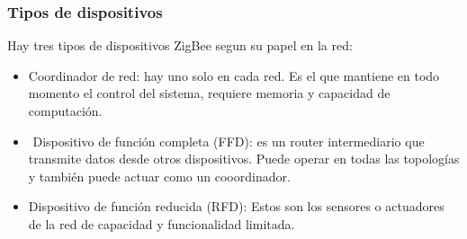 \documentclass[10pt,a4paper,spanish]{beamer}
\begin{document}


\begin{frame}
	\frametitle{Tipos de dispositivos}
	Hay tres tipos de dispositivos ZigBee segun su papel en la red:

	\begin{block}{}
		\begin{itemize}
			\item Coordinador de red: hay uno solo en cada red. Es el que mantiene en todo momento el control del sistema, requiere memoria y capacidad de computación.
			\item  Dispositivo de función completa (FFD): es un router intermediario que transmite datos desde otros dispositivos. Puede operar en todas las topologías y también puede actuar como un cooordinador.
			\item Dispositivo de función reducida (RFD): Estos son los sensores o actuadores de la red de capacidad y funcionalidad limitada.
		\end{itemize}
	\end{block}
\end{frame}
\end{document}
